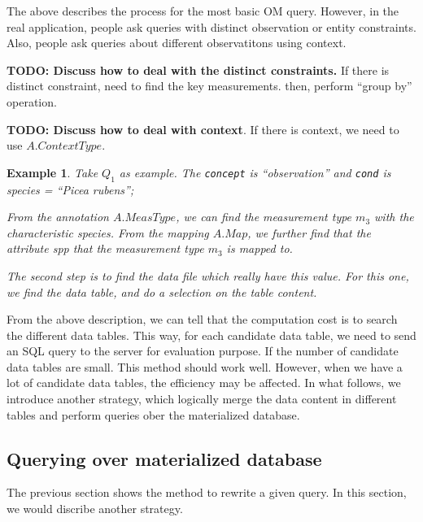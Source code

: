 \documentclass[conference]{IEEEtran}
\newtheorem{example}{Example}[section]
\begin{document}
The above describes the process for the most basic OM query. 
However, in the real application, people ask queries with distinct
observation or entity constraints. Also, people ask queries about
different observatitons using context. 

{\bf TODO: Discuss how to deal with the distinct constraints. }
If there is distinct constraint, need to find the key measurements. 
then, perform ``group by'' operation. 

{\bf TODO: Discuss how to deal with context}. 
If there is context, we need to use $A.ContextType$. 


\begin{example}\label{eg:query_reqerite_q1}
Take $Q_1$ as example. The {\tt concept} is ``observation'' and {\tt cond} is {\em species = ``Picea rubens''}; 

From the annotation $A.MeasType$, we can find the measurement type
$m_3$ with the characteristic {\em species}. 
From the mapping $A.Map$, we further find that the attribute {\em spp} that the
measurement type $m_3$ is mapped to. 

The second step is to find the data file which really have this value. 
For this one, we find the data table, and do a selection on the table content. 
\end{example}

From the above description, we can tell that the computation cost is to search the different data
tables. This way, for each candidate data table, we need to send an
SQL query to the server for evaluation purpose.
If the number of candidate data tables are small. This method should
work well. However, when we have a lot of candidate data tables, the
efficiency may be affected. 
In what follows, we introduce another strategy, which logically merge
the data content in different tables and perform queries ober the
materialized database. 

\subsection{Querying over materialized database}\label{sec:matdb}

The previous section shows the method to rewrite a given query. 
In this section, we would discribe another strategy. 
\end{document}
